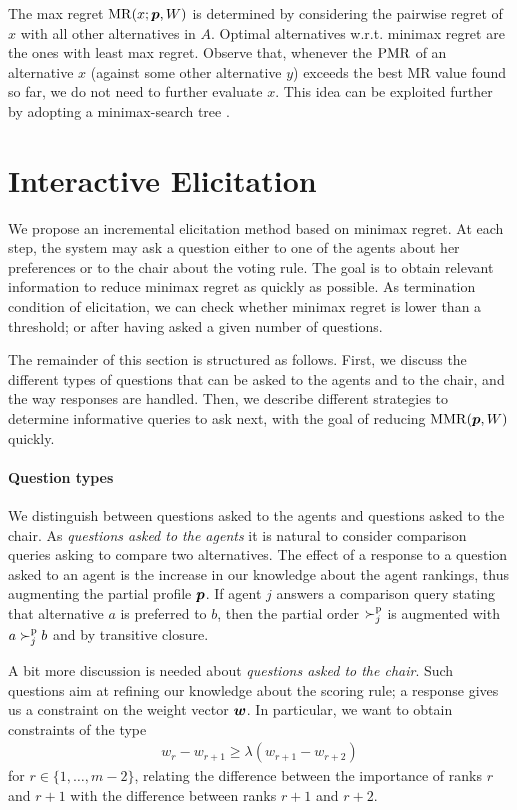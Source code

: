 \documentclass{article}
\begin{document}
The max regret $\operatorname{MR}(x; {\bm{p}}, W)$ is determined by considering the pairwise regret of $x$ with all other alternatives in $A$.
Optimal alternatives w.r.t. minimax regret are the ones with least max regret. 
Observe that, whenever the $\operatorname{PMR}$ of an alternative $x$ (against some other alternative $y$) exceeds the best MR value found so far, we do not need to further evaluate $x$. 
This idea can be exploited further by adopting a minimax-search tree \citep{Braziunas2012}.

\section{Interactive Elicitation} 
\label{sec:elicit}
We propose an incremental elicitation method based on minimax regret.
At each step, the system may ask a question either to one of the agents about her preferences or to the chair about the voting rule. 
The goal is to obtain relevant information to reduce minimax regret as quickly as possible.
As termination condition of elicitation, we can check whether minimax regret is lower than a threshold; or after having asked a given number of questions.

The remainder of this section is structured as follows.
First, we discuss the different types of questions that can be asked to the agents and to the chair, and the way responses are handled.
Then, we describe different strategies to determine informative queries to ask next, with the goal of reducing $\operatorname{MMR}({\bm{p}},W)$ quickly.

\paragraph{Question types}
We distinguish between questions asked to the agents and questions asked to the chair.
As {\em questions asked to the agents} it is natural to consider comparison queries asking to compare two alternatives.
The effect of a response to a question asked to an agent is the increase in our knowledge about the agent rankings, thus augmenting the partial profile ${\bm{p}}$. 
If agent $j$ answers a comparison query stating that alternative $a$ is preferred to $b$, then the partial order $\succ^\text{p}_j$ is augmented with $a \succ^\text{p}_j b$ and by transitive closure.

A bit more discussion is needed about {\em questions asked to the chair}.
Such questions aim at refining our knowledge about the scoring rule; a response gives us a constraint on the weight vector $\bm{w}$.
In particular, we want to obtain constraints of the type
\begin{align}
	w_{r} - w_{r+1} \geq \lambda (w_{r+1} - w_{r+2})
\end{align}
for $r \in \{1,\ldots,m-2\}$, relating the difference between the importance of ranks $r$ and $r+1$ with the difference between ranks $r+1$ and $r+2$.
\end{document}
